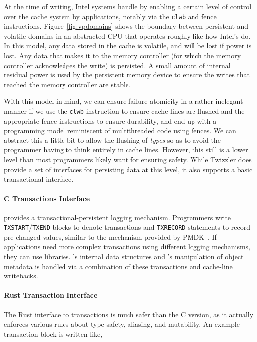 At the time of writing, Intel systems handle \NVM by enabling a certain level of control over the cache system by
applications, notably via the \texttt{clwb} and fence instructions. Figure~\ref{fig:vpdomains} shows the boundary
between persistent and volatile domains in an abstracted CPU that operates roughly like how Intel's do. In this model,
any data stored in the cache is volatile, and will be lost if power is lost. Any data that makes it to the memory
controller (for which the memory controller acknowledges the write) is persisted. A small amount of internal residual
power is used by the persistent memory device to ensure the writes that reached the memory controller are stable.

With this model in mind, we can ensure failure atomicity in a rather inelegant manner if we use the \texttt{clwb}
instruction to ensure cache lines are flushed and the appropriate fence instructions to ensure durability, and end up
with a programming model reminiscent of multithreaded code using fences. We can abstract this a little bit to allow the
flushing of \emph{types} so as to avoid the programmer having to think entirely in cache lines. However, this still is a
lower level than most programmers likely want for ensuring safety. While Twizzler does provide a set of interfaces for
persisting data at this level, it also supports a basic transactional interface.


\paragraph{C Transactions Interface}
\Twizzler provides a transactional-persistent logging mechanism.
Programmers write \texttt{TXSTART}/\texttt{TXEND} blocks to denote transactions and \texttt{TXRECORD}
statements to record pre-changed values, similar to the mechanism provided by
PMDK~\cite{libpmem}. If applications need more complex
transactions using different logging mechanisms, they can use libraries. \Twizzler's internal data
structures and \libcore's manipulation of object metadata is handled via a combination of these
transactions and cache-line writebacks.


\paragraph{Rust Transaction Interface}

The Rust interface to transactions is much safer than the C version, as it actually enforces various rules about type
safety, aliasing, and mutability. An example transaction block is written like,

